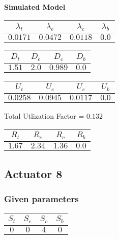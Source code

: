 \documentclass{article}
\begin{document}
\begin{minipage}{0.5\textwidth}
\centering	\textbf{Simulated Model}
\begin{table}[H]
\centering
\begin{tabular}{@{}cccc@{}}
\toprule
$\lambda_t$ & $\lambda_e$ & $\lambda_c$ & $\lambda_b$\\
\midrule
$0.0171$ & $0.0472$ & $0.0118$ & $0.0$\\
\bottomrule
\end{tabular}
\end{table}
\begin{table}[H]
\centering
\begin{tabular}{@{}cccc@{}}
\toprule
$D_t$ & $D_e$ & $D_c$ & $D_b$\\
\midrule
$1.51$ & $2.0$ & $0.989$ & $0.0$\\
\bottomrule
\end{tabular}
\end{table}\begin{table}[H]
\centering
\begin{tabular}{@{}cccc@{}}
\toprule
$U_t$ & $U_e$ & $U_c$ & $U_b$\\
\midrule
$0.0258$ & $0.0945$ & $0.0117$ & $0.0$\\
\bottomrule
\end{tabular}
\end{table}
\centering Total Utlization Factor = $0.132$
\begin{table}[H]
\centering
\begin{tabular}{@{}cccc@{}}
\toprule
$R_t$ & $R_e$ & $R_c$ & $R_b$\\
\midrule
$1.67$ & $2.34$ & $1.36$ & $0.0$\\
\bottomrule
\end{tabular}
\end{table}
\end{minipage}
\newpage\subsection{Actuator 8}
\subsubsection{Given parameters}
\begin{table}[H]
\centering
\begin{tabular}{@{}cccc@{}}
\toprule
$S_t$ & $S_e$ & $S_c$ & $S_b$\\
\midrule
$0$ & $0$ & $4$ & $0$\\
\bottomrule
\end{tabular}
\end{table}
\end{document}
